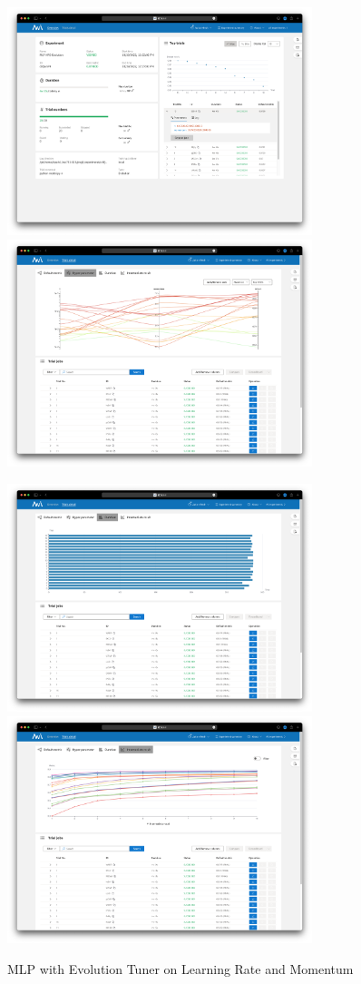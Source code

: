 \documentclass{article}
\begin{document}
\begin{figure}
	\centerline{\includegraphics[width=3.5in]{../proj3/figures/mlp_evolution_overview.png}\includegraphics[width=3.5in]{../proj3/figures/mlp_evolution_hyperparameter.png}}
	\centerline{\includegraphics[width=3.5in]{../proj3/figures/mlp_evolution_latency.png}\includegraphics[width=3.5in]{../proj3/figures/mlp_evolution_intermediate.png}}
	\caption{MLP with Evolution Tuner on Learning Rate and Momentum}
	\label{fig:mlp-evolution}
\end{figure}
\end{document}
